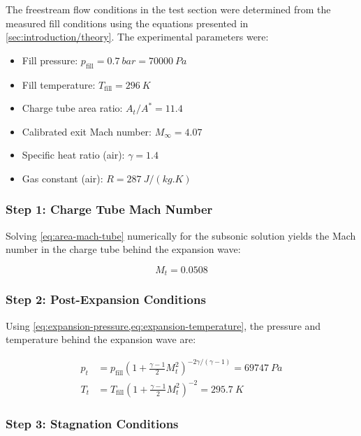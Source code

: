 The freestream flow conditions in the test section were determined from the measured fill conditions using the equations presented in \ref{sec:introduction/theory}. The experimental parameters were:

\begin{itemize}
    \item Fill pressure: $p_{\text{fill}} = \qty{0.7}{bar} = \qty{70000}{Pa}$
    \item Fill temperature: $T_{\text{fill}} = \qty{296}{K}$
    \item Charge tube area ratio: $A_t/A^* = 11.4$
    \item Calibrated exit Mach number: $M_\infty = 4.07$
    \item Specific heat ratio (air): $\gamma = 1.4$
    \item Gas constant (air): $R = \qty{287}{J/(kg.K)}$
\end{itemize}

\subsubsection{Step 1: Charge Tube Mach Number}

Solving \cref{eq:area-mach-tube} numerically for the subsonic solution yields the Mach number in the charge tube behind the expansion wave:

\begin{equation}
    M_t = 0.0508
\end{equation}

\subsubsection{Step 2: Post-Expansion Conditions}

Using \cref{eq:expansion-pressure,eq:expansion-temperature}, the pressure and temperature behind the expansion wave are:

\begin{align}
    p_t &= p_{\text{fill}} \left(1 + \frac{\gamma - 1}{2}M_t^2\right)^{-2\gamma/(\gamma-1)} = \qty{69747}{Pa} \\
    T_t &= T_{\text{fill}} \left(1 + \frac{\gamma - 1}{2}M_t^2\right)^{-2} = \qty{295.7}{K}
\end{align}

\subsubsection{Step 3: Stagnation Conditions}

